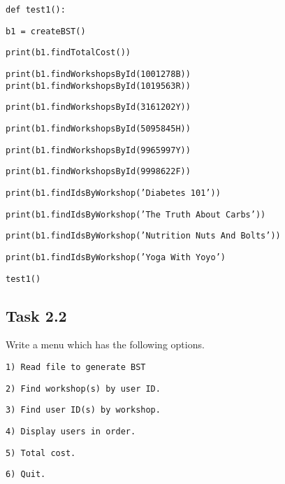 \noindent\begin{minipage}[t]{1\columnwidth}%
\texttt{def test1(): }

\texttt{\qquad{}b1 = createBST() }

\texttt{\qquad{}print(b1.findTotalCost()) }

\texttt{\qquad{}print(b1.findWorkshopsById(\textquotedbl 1001278B\textquotedbl ))
\qquad{}print(b1.findWorkshopsById(\textquotedbl 1019563R\textquotedbl )) }

\texttt{\qquad{}print(b1.findWorkshopsById(\textquotedbl 3161202Y\textquotedbl ))}

\texttt{\qquad{}print(b1.findWorkshopsById(\textquotedbl 5095845H\textquotedbl ))}

\texttt{\qquad{}print(b1.findWorkshopsById(\textquotedbl 9965997Y\textquotedbl ))}

\texttt{\qquad{}print(b1.findWorkshopsById(\textquotedbl 9998622F\textquotedbl )) }

\texttt{\qquad{}print(b1.findIdsByWorkshop('Diabetes 101')) }

\texttt{\qquad{}print(b1.findIdsByWorkshop('The Truth About Carbs')) }

\texttt{\qquad{}print(b1.findIdsByWorkshop('Nutrition Nuts And Bolts'))}

\texttt{\qquad{}print(b1.findIdsByWorkshop('Yoga With Yoyo')}

\texttt{test1() }%
\end{minipage}

\subsection*{Task 2.2 }

Write a menu which has the following options.

\noindent\begin{minipage}[t]{1\columnwidth}%
\texttt{1) Read file to generate BST }

\texttt{2) Find workshop(s) by user ID. }

\texttt{3) Find user ID(s) by workshop. }

\texttt{4) Display users in order. }

\texttt{5) Total cost.}

\texttt{6) Quit.}%
\end{minipage}

